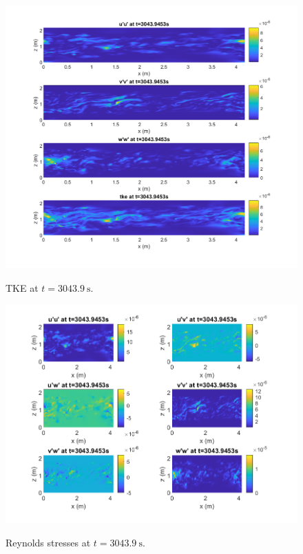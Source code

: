 \documentclass[12pt]{article}
\begin{document}
\begin{enumerate}
\begin{enumerate}
			
			
			\begin{figure}[htpb]
				\centering
				\includegraphics[width=\textwidth]{1-plots/tke_plot_3043.png}
				\label{fig:tke 3043}
				\caption{TKE at $t=\SI{3043.9}{\second}$.}
			\end{figure}
		
			\begin{figure}[htbp]
				\centering
				\includegraphics[width=\textwidth]{1-plots/ReynoldsStress_plot_3043.png}
				\label{fig:reynolds 3043}
				\caption{Reynolds stresses at $t=\SI{3043.9}{\second}$.}
			\end{figure}
			

\end{enumerate}
\end{enumerate}
\end{document}
